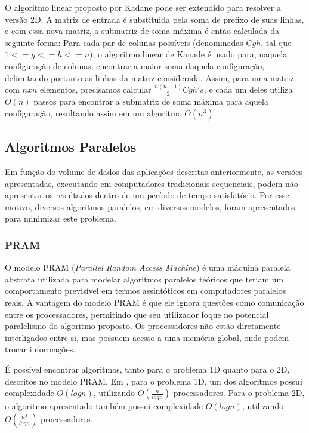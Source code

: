 \documentclass[a4paper, 12pt] {article}
\begin{document}
O algoritmo linear proposto por Kadane pode ser extendido para resolver a versão
2D. A matriz de entrada é substituida pela soma de prefixo de suas linhas, e com
essa nova matriz, a submatriz de soma máxima é então calculada da seguinte
forma: Para cada par de colunas possíveis (denominadas $Cgh$, tal que $1 <= g
<= h <= n$), o algoritmo linear de Kanade é usado para, naquela configuração de
colunas, encontrar a maior soma daquela configuração, delimitando portanto as linhas da matriz considerada. Assim, para
uma matriz com $nxn$ elementos, precisamos calcular $\frac{n(n-1)}{2} Cgh's$, e
cada um deles utiliza $O(n)$ passos para encontrar a submatriz de soma máxima
para aquela configuração, resultando assim em um algoritmo $O(n^3)$.

\subsection{Algoritmos Paralelos}

Em função do volume de dados das aplicações descritas anteriormente, as
versões apresentadas, executando em computadores tradicionais sequenciais, podem
não apresentar os resultados dentro de um período de tempo satisfatório. Por
esse motivo, diversos algoritmos paralelos, em diversos modelos, foram
apresentados para minimizar este problema.

\subsubsection{PRAM}

O modelo PRAM (\textit{Parallel Random Access Machine}) é uma máquina paralela
abstrata utilizada para modelar algoritmos paralelos teóricos que teriam um
comportamento previsível em termos assintóticos em computadores paralelos reais.
A vantagem do modelo PRAM é que ele ignora questões como comunicação entre os
processadores, permitindo que seu utilizador foque no potencial paralelismo do
algoritmo proposto. Os processadores não estão diretamente interligados entre
si, mas possuem acesso a uma memória global, onde podem trocar informações.

É possível encontrar algoritmos, tanto para o problema 1D quanto para o 2D,
descritos no modelo PRAM. Em \cite{journals/ppl/PerumallaD95}, para o problema
1D, um dos algoritmos  possui complexidade $O(log n)$, utilizando $O(\frac{n}{log
n})$ processadores. Para o problema 2D, o algoritmo apresentado também possui
complexidade $O(log n)$, utilizando $O(\frac{n^3}{log
n})$ processadores.
\end{document}

